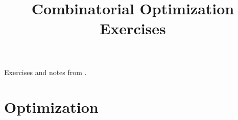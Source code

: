 \documentclass{article}
\title{Combinatorial Optimization Exercises}
\begin{document}
\maketitle

Exercises and notes from \citet{combopt-pap}.

\section{Optimization}



\end{document}
